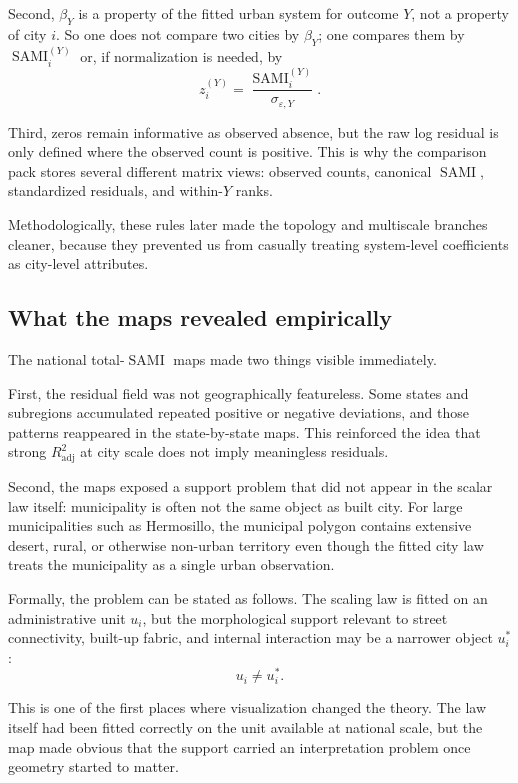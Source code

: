 \documentclass[11pt]{article}
\newcommand{\SAMI}{\operatorname{SAMI}}
\newcommand{\adjR}{R^2_{\mathrm{adj}}}
\begin{document}
Second, \(\beta_Y\) is a property of the fitted urban system for outcome \(Y\), not a property of city \(i\). So one does not compare two cities by \(\beta_Y\); one compares them by \(\SAMI_i^{(Y)}\) or, if normalization is needed, by
\begin{equation}
z_i^{(Y)} = \frac{\SAMI_i^{(Y)}}{\sigma_{\varepsilon,Y}}.
\end{equation}

Third, zeros remain informative as observed absence, but the raw log residual is only defined where the observed count is positive. This is why the comparison pack stores several different matrix views: observed counts, canonical \(\SAMI\), standardized residuals, and within-\(Y\) ranks.

Methodologically, these rules later made the topology and multiscale branches cleaner, because they prevented us from casually treating system-level coefficients as city-level attributes.

\subsection{What the maps revealed empirically}

The national total-\(\SAMI\) maps made two things visible immediately.

First, the residual field was not geographically featureless. Some states and subregions accumulated repeated positive or negative deviations, and those patterns reappeared in the state-by-state maps. This reinforced the idea that strong \(\adjR\) at city scale does not imply meaningless residuals.

Second, the maps exposed a support problem that did not appear in the scalar law itself: municipality is often not the same object as built city. For large municipalities such as Hermosillo, the municipal polygon contains extensive desert, rural, or otherwise non-urban territory even though the fitted city law treats the municipality as a single urban observation.

Formally, the problem can be stated as follows. The scaling law is fitted on an administrative unit \(u_i\), but the morphological support relevant to street connectivity, built-up fabric, and internal interaction may be a narrower object \(u_i^\ast\):
\begin{equation}
u_i \neq u_i^\ast.
\label{eq:support-mismatch}
\end{equation}

This is one of the first places where visualization changed the theory. The law itself had been fitted correctly on the unit available at national scale, but the map made obvious that the support carried an interpretation problem once geometry started to matter.
\end{document}
